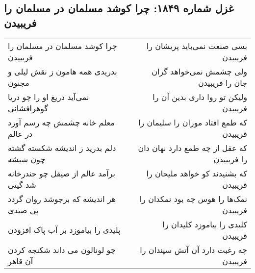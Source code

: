 \begin{center}
\section*{غزل شماره ۱۸۴۹: چرا کوشد مسلمان در مسلمان را فریبیدن}
\label{sec:1849}
\begin{longtable}{l p{0.5cm} r}
چرا کوشد مسلمان در مسلمان را فریبیدن
&&
بسی صنعت نمی‌باید پریشان را فریبیدن
\\
بدریدی همه هامون ز نقش لیلی و مجنون
&&
ولی چشمش نمی‌خواهد گران جان را فریبیدن
\\
نمی‌آید دریغ او را چو دریا گوهرافشانی
&&
ولیکن تو روا داری بدین آن را فریبیدن
\\
معلم خانه چشمش چه رسم آورد در عالم
&&
که طمع افتاد موران را سلیمان را فریبیدن
\\
دلم بدرید ز اندیشه شکسته گشته چون شیشه
&&
که عقل از چه طمع دارد نهان دان را فریبیدن
\\
برآمد عالم از صیقل چو جندرخانه شد گیتی
&&
که بشنیدند کو خواهد ملیحان را فریبیدن
\\
هر اندیشه که برجوشد روان گردد پی صیدی
&&
نمک‌ها را هوس چه بود نمکدان را فریبیدن
\\
پلیدی را بیاموزد بر آب پاک افزودن
&&
کلیدی را بیاموزد کلیدان را فریبیدن
\\
چو لونالون می داند شکنجه کردن آن قاهر
&&
چه رغبت دارد آن آتش سپندان را فریبیدن
\\
\end{longtable}
\end{center}
